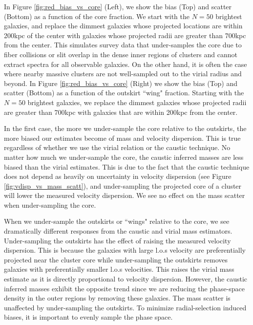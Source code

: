 \documentclass[iop]{emulateapj}
\begin{document}
In Figure \ref{fig:red_bias_vs_core} (Left), we show the bias (Top) and scatter (Bottom) as a function of the core fraction. We start with the $N = 50$ brightest galaxies, and replace the dimmest galaxies whose projected locations are within 200kpc of the center with galaxies whose projected radii are greater than 700kpc from the center. This simulates survey data that under-samples the core due to fiber collisions or slit overlap in the dense inner regions of clusters and cannot extract spectra for all observable galaxies.  On the other hand, it is often the case where nearby massive clusters are not well-sampled out to the virial radius and beyond. In Figure \ref{fig:red_bias_vs_core} (Right) we show the bias (Top) and scatter (Bottom) as a function of the outskirt ``wing" fraction. Starting with the $N = 50$ brightest galaxies, we replace the dimmest galaxies whose projected radii are greater than 700kpc with galaxies that are within 200kpc from the center.

In the first case, the more we under-sample the core relative to the outskirts, the more biased our estimates become of mass and velocity dispersion. This is true regardless of whether we use the virial relation or the caustic technique. No matter how much we under-sample the core, the caustic inferred masses are less biased than the virial estimates. This is due to the fact that the caustic technique does not depend as heavily on uncertainty in velocity dispersion (see Figure \ref{fig:vdisp_vs_mass_scatt}), and under-sampling the projected core of a cluster will lower the measured velocity dispersion. We see no effect on the mass scatter when under-sampling the core.

When we under-sample the outskirts or ``wings" relative to the core, we see dramatically different responses from the caustic and virial mass estimators. Under-sampling the outskirts has the effect of raising the measured velocity dispersion. This is because the galaxies with large l.o.s velocity are preferentially projected near the cluster core while under-sampling the outskirts removes galaxies with preferentially smaller l.o.s velocities. This raises the virial mass estimate as it is directly proportional to velocity dispersion. However, the caustic inferred masses exhibit the opposite trend since we are reducing the phase-space density in the outer regions by removing these galaxies. The mass scatter is unaffected by under-sampling the outskirts. To minimize radial-selection induced biases, it is important to evenly sample the phase space. 
\end{document}
